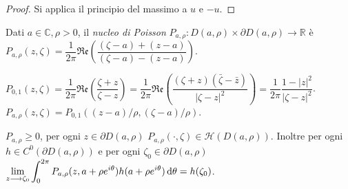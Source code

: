 \begin{proof}
  Si applica il principio del massimo a $u$ e $-u$.
\end{proof}

\begin{defn}
  Dati $a \in \mathbb{C}, \rho>0$, il \textit{nucleo di Poisson} $P_{a,\rho}:D(a,\rho)\times\partial D(a,\rho) \longrightarrow \mathbb{R}$ è $P_{a,\rho}(z, \zeta)=\dfrac{1}{2\pi}\mathfrak{Re}\left(\dfrac{(\zeta-a)+(z-a)}{(\zeta-a)-(z-a)}\right)$.
\end{defn}

\begin{oss} \label{P01}
  $P_{0,1}(z,\zeta)=\dfrac{1}{2\pi}\mathfrak{Re}\left(\dfrac{\zeta+z}{\zeta-z}\right)=\dfrac{1}{2\pi}\mathfrak{Re}\left(\dfrac{(\zeta+z)(\bar{\zeta}-\bar{z})}{|\zeta-z|^2}\right)=\dfrac{1}{2\pi}\dfrac{1-|z|^2}{|\zeta-z|^2}$.
  $P_{a,\rho}(z,\zeta)=P_{0,1}((z-a)/\rho,(\zeta-a)/\rho)$.
\end{oss}

\begin{prop} \label{prop_nuc}
  $P_{a, \rho} \ge 0$, per ogni $z \in \partial D(a, \rho)$ $P_{a, \rho}(\cdot,\zeta) \in \mathcal{H}(D(a,\rho))$.
  Inoltre per ogni $h \in C^0(\partial D(a,\rho))$ e per ogni $\zeta_0 \in \partial D(a,\rho)$ $\displaystyle \lim_{z \longrightarrow \zeta_0} \int_0^{2\pi} P_{a,\rho}(z,a+\rho e^{i\theta})h(a+\rho e^{i\theta})\mathop{}\!\mathrm{d}\theta=h(\zeta_0)$.
\end{prop}

